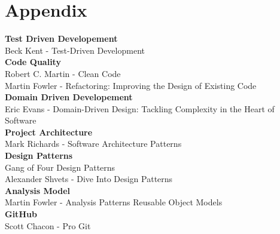 \documentclass{article}
\begin{document}
\newpage
\part{Appendix}
\textbf{Test Driven Developement}\\
Beck Kent - Test-Driven Development\\
\textbf{Code Quality}\\
Robert C. Martin - Clean Code\\
Martin Fowler - Refactoring: Improving the Design of Existing Code\\
\textbf{Domain Driven Developement}\\
Eric Evans - Domain-Driven Design: Tackling Complexity in the Heart of Software\\
\textbf{Project Architecture}\\
Mark Richards - Software Architecture Patterns\\
\textbf{Design Patterns}\\
Gang of Four Design Patterns\\
Alexander Shvets - Dive Into Design Patterns\\
\textbf{Analysis Model}\\
Martin Fowler - Analysis Patterns Reusable Object Models\\
\textbf{GitHub}\\
Scott Chacon - Pro Git\\
\end{document}
